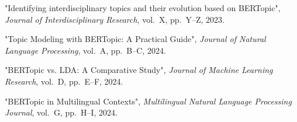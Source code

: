 \documentclass[12pt]{article}
\begin{document}



\begin{thebibliography}{1}

\newblock "Identifying interdisciplinary topics and their evolution based on BERTopic",
\newblock \textit{Journal of Interdisciplinary Research},
\newblock vol.~X, pp.~Y--Z, 2023.

\newblock "Topic Modeling with BERTopic: A Practical Guide",
\newblock \textit{Journal of Natural Language Processing},
\newblock vol.~A, pp.~B--C, 2024.

\newblock "BERTopic vs. LDA: A Comparative Study",
\newblock \textit{Journal of Machine Learning Research},
\newblock vol.~D, pp.~E--F, 2024.

\newblock "BERTopic in Multilingual Contexts",
\newblock \textit{Multilingual Natural Language Processing Journal},
\newblock vol.~G, pp.~H--I, 2024.

\end{thebibliography}
\addappheadtotoc 
\end{document}
